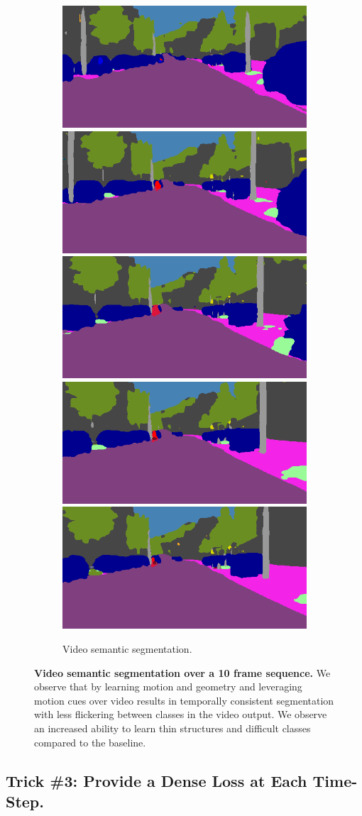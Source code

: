 \begin{figure}[t]
\begin{subfigure}[t]{\linewidth}
\begin{center}
\includegraphics[width=0.19\linewidth]{seq/image_000086_000001_segmentation.png}
\includegraphics[width=0.19\linewidth]{seq/image_000086_000004_segmentation.png}
\includegraphics[width=0.19\linewidth]{seq/image_000086_000007_segmentation.png}
\includegraphics[width=0.19\linewidth]{seq/image_000086_000008_segmentation.png}
\includegraphics[width=0.19\linewidth]{seq/image_000086_000009_segmentation.png}
\vspace{-2mm}
  \caption{Video semantic segmentation.}
\end{center}
\end{subfigure}
\vspace{-2mm}
   \caption[Video sequence results.]{\textbf{Video semantic segmentation over a 10 frame sequence.} We observe that by learning motion and geometry and leveraging motion cues over video results in temporally consistent segmentation with less flickering between classes in the video output. We observe an increased ability to learn thin structures and difficult classes compared to the baseline.}
\label{fig:results2}
\vspace{-3mm}
\end{figure}


\subsection{Trick \#3: Provide a Dense Loss at Each Time-Step.} 


